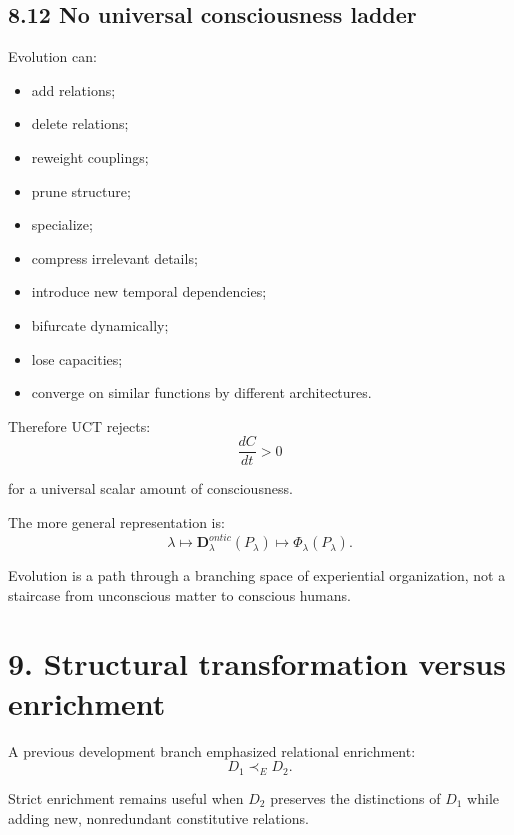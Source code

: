 \documentclass[
  11pt,
  a4paper,
]{article}
\providecommand{\tightlist}{%
  \setlength{\itemsep}{0pt}\setlength{\parskip}{0pt}}
\begin{document}
\hypertarget{no-universal-consciousness-ladder}{%
\subsection{8.12 No universal consciousness
ladder}\label{no-universal-consciousness-ladder}}

Evolution can:

\begin{itemize}
\tightlist
\item
  add relations;
\item
  delete relations;
\item
  reweight couplings;
\item
  prune structure;
\item
  specialize;
\item
  compress irrelevant details;
\item
  introduce new temporal dependencies;
\item
  bifurcate dynamically;
\item
  lose capacities;
\item
  converge on similar functions by different architectures.
\end{itemize}

Therefore UCT rejects:
\nopagebreak[4]
\[
\boxed{
\frac{dC}{dt}>0
}
\]

for a universal scalar amount of consciousness.

The more general representation is:
\nopagebreak[4]
\[
\boxed{
\lambda
\mapsto
\mathbf D^{ontic}_\lambda(P_\lambda)
\mapsto
\Phi_\lambda(P_\lambda).
}
\]

Evolution is a path through a branching space of experiential
organization, not a staircase from unconscious matter to conscious
humans.

\hypertarget{structural-transformation-versus-enrichment}{%
\section{9. Structural transformation versus
enrichment}\label{structural-transformation-versus-enrichment}}

A previous development branch emphasized relational enrichment:
\nopagebreak[4]
\[
D_1\prec_E D_2.
\]

Strict enrichment remains useful when \(D_2\) preserves the distinctions
of \(D_1\) while adding new, nonredundant constitutive relations.
\end{document}
